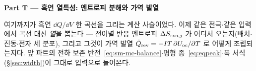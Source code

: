 \clearpage
\begin{center}
{\LARGE\bfseries Part T --- 흑연 열특성: 엔트로피 분해와 가역 발열}
\end{center}
\vspace{0.6em}
여기까지가 흑연 $\dd Q/\dd V$ 한 곡선을 그리는 계산 사슬이었다. 이제 같은 전극$\cdot$같은 입력에서
곡선 대신 \emph{열}을 뽑는다 --- 전이별 반응 엔트로피 $\Delta S_{\mathrm{rxn},j}$ 가 어디서 오는지(배치$\cdot$진동$\cdot$전자
세 분포), 그리고 그것이 가역 발열 $\dot Q_{\mathrm{rev}}=-IT\,\partial U_{\mathrm{oc}}/\partial T$ 로 어떻게 조립되는지다.
앞 파트의 전하 보존 반전~\eqref{eq:sm-mc-balance}$\cdot$평형 종~\eqref{eq:eqpeak}$\cdot$폭 서식(\S\ref{sec:width})이 그대로 입력으로 들어온다.
